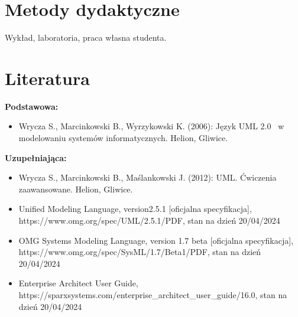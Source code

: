 \documentclass[12pt, a4paper]{article}
\begin{document}
\section{Metody dydaktyczne}

Wykład, laboratoria, praca własna studenta.

\section{Literatura}

\textbf{Podstawowa:}
\begin{itemize}
  \item Wrycza S., Marcinkowski B., Wyrzykowski K. (2006): Język UML 2.0  w modelowaniu systemów informatycznych. Helion, Gliwice.
\end{itemize}

\textbf{Uzupełniająca:}
\begin{itemize}
  \item Wrycza S., Marcinkowski B., Maślankowski J. (2012): UML. Ćwiczenia zaawansowane. Helion, Gliwice.
  \item Unified Modeling Language, version2.5.1 [oficjalna specyfikacja], https://www.omg.org/spec/UML/2.5.1/PDF, stan na dzień 20/04/2024
  \item OMG Systems Modeling Language, version 1.7 beta [oficjalna specyfikacja], https://www.omg.org/spec/SysML/1.7/Beta1/PDF, stan na dzień 20/04/2024
  \item Enterprise Architect User Guide, https://sparxsystems.com/enterprise\_architect\_user\_guide/16.0, stan na dzień 20/04/2024
\end{itemize}
\end{document}
